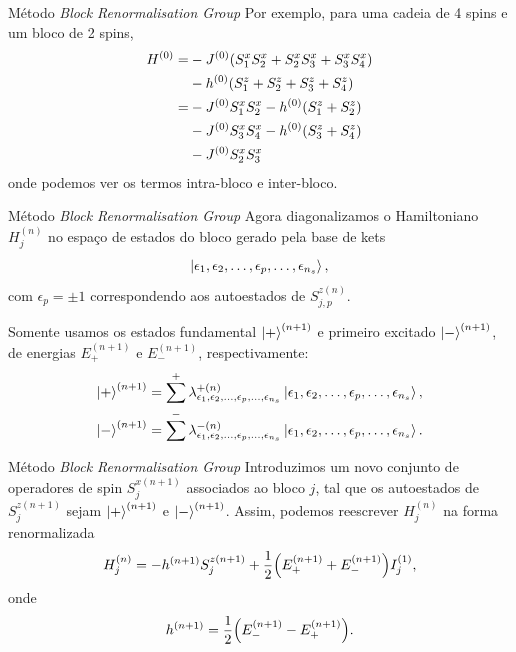 \documentclass[brazil]{beamer}
\begin{document}
\begin{frame}{Método \textit{Block Renormalisation Group}}
    Por exemplo, para uma cadeia de 4 spins e um bloco de 2 spins,
    \begin{align}
        H^{(0)} = & - J^{(0)} \qty( S_1^x S_2^x + S_2^x S_3^x + S_3^x S_4^x ) \\
                  & - h^{(0)} \qty( S_1^z + S_2^z + S_3^z + S_4^z )           \\
        =         & - J^{(0)} S_1^x S_2^x - h^{(0)} ( S_1^z + S_2^z )         \\
                  & - J^{(0)} S_3^x S_4^x - h^{(0)} ( S_3^z + S_4^z )         \\
                  & - J^{(0)} S_2^x S_3^x
    \end{align}
    onde podemos ver os termos intra-bloco e inter-bloco.
\end{frame}

\begin{frame}{Método \textit{Block Renormalisation Group}}
    Agora diagonalizamos o Hamiltoniano \( H_j^{(n)} \) no espaço de estados do bloco gerado pela base de kets
    \begin{equation}
        \ket{\epsilon_1, \epsilon_2, \dotsc, \epsilon_p, \dotsc, \epsilon_{n_s}} ,
    \end{equation}
    com \( \epsilon_p = \pm 1 \) correspondendo aos autoestados de \( S_{j, p}^{z(n)} \).

    Somente usamos os estados fundamental \( \ket{+}^{(n + 1)} \) e primeiro excitado \( \ket{-}^{(n + 1)} \), de energias \( E_+^{(n + 1)} \) e \( E_-^{(n + 1)} \), respectivamente:
    \begin{gather}
        \ket{+}^{(n + 1)} = \sum^+ \lambda_{\epsilon_1, \epsilon_2, \dotsc, \epsilon_p, \dotsc, \epsilon_{n_s}}^{+ (n)} \ket{\epsilon_1, \epsilon_2, \dotsc, \epsilon_p, \dotsc, \epsilon_{n_s}} , \\
        \ket{-}^{(n + 1)} = \sum^- \lambda_{\epsilon_1, \epsilon_2, \dotsc, \epsilon_p, \dotsc, \epsilon_{n_s}}^{- (n)} \ket{\epsilon_1, \epsilon_2, \dotsc, \epsilon_p, \dotsc, \epsilon_{n_s}}.
    \end{gather}
\end{frame}

\begin{frame}{Método \textit{Block Renormalisation Group}}
    Introduzimos um novo conjunto de operadores de spin \( S_j^{x (n + 1)} \) associados ao bloco \( j \), tal que os autoestados de \( S_j^{z (n + 1)} \) sejam \( \ket{+}^{(n + 1)} \) e \( \ket{-}^{(n + 1)} \).
    Assim, podemos reescrever \( H_j^{(n)} \) na forma renormalizada
    \begin{equation}
        H_j^{(n)} = - h^{(n + 1)} S_j^{z (n + 1)} + \frac{1}{2} \qty( E_+^{(n + 1)} + E_-^{(n + 1)} ) I_j^{(1)} , \label{intrabloco}
    \end{equation}
    onde
    \begin{equation}
        h^{(n + 1)} = \frac{1}{2} \qty(E_-^{(n + 1)} - E_+^{(n + 1)}) . %
    \end{equation}
\end{frame}
\end{document}
